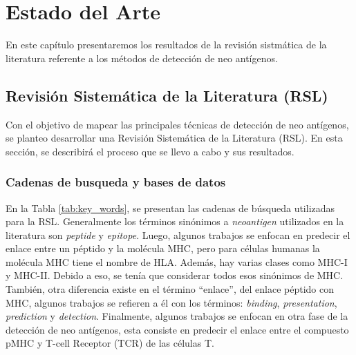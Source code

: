 \chapter{Estado del Arte}
\label{cap:estadodelarte}

En este capítulo presentaremos los resultados de la revisión sistmática de la literatura referente a los métodos de detección de neo antígenos.


\section{Revisión Sistemática de la Literatura (RSL)}

Con el objetivo de mapear las principales técnicas de detección de  neo antígenos, se planteo desarrollar una Revisión Sistemática de la Literatura (RSL). En esta sección, se describirá el proceso que se llevo a cabo y sus resultados.


\subsection{Cadenas de busqueda y bases de datos}

En la Tabla \ref{tab:key_words}, se presentan las cadenas de búsqueda utilizadas para la RSL. Generalmente los términos sinónimos a \textit{neoantigen} utilizados en la literatura son \textit{peptide} y \textit{epitope}. Luego, algunos trabajos se enfocan en predecir el enlace entre un péptido y la molécula MHC, pero para células humanas la molécula MHC tiene el nombre de HLA. Además, hay varias clases como MHC-I y MHC-II. Debido a eso, se tenía que considerar todos esos sinónimos de MHC. También, otra diferencia existe en el término ``enlace'', del enlace péptido con MHC, algunos trabajos se refieren a él con los términos: \textit{binding}, \textit{presentation}, \textit{prediction} y \textit{detection}. Finalmente, algunos trabajos se enfocan en otra fase de la detección de neo antígenos, esta consiste en predecir el enlace entre el compuesto pMHC y T-cell Receptor (TCR) de las células T.

